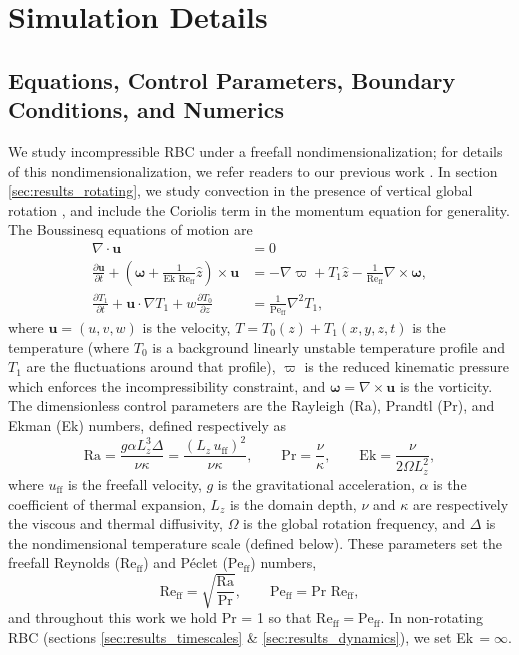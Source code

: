 \documentclass[aps, pre, onecolumn, nofootinbib, notitlepage, groupedaddress, amsfonts, amssymb, amsmath, longbibliography, superscriptaddress]{revtex4-1}
\newcommand{\DivU}{\ensuremath{\nabla\cdot\bm{u}}}
\newcommand{\grad}{\ensuremath{\nabla}}
\newcommand{\Reff}{\ensuremath{\text{Re}_{\text{ff}}}}
\newcommand{\Peff}{\ensuremath{\text{Pe}_{\text{ff}}}}
\begin{document}
\section{Simulation Details}
\label{sec:simulations}

\subsection{Equations, Control Parameters, Boundary Conditions, and Numerics}
We study incompressible RBC under a freefall nondimensionalization; for details of this nondimensionalization, we refer readers to our previous work \cite{anders&all2018}.
In section \ref{sec:results_rotating}, we study convection in the presence of vertical global rotation \cite{julien&all1996}, and include the Coriolis term in the momentum equation for generality.
The Boussinesq equations of motion are
\begin{align}
\DivU &= 0
	\label{eqn:incompressible}
\\
\frac{\partial \bm{u}}{\partial t} + \left(\bm{\omega} + \frac{1}{\text{Ek }\Reff}\hat{z}\right)\times\bm{u} 
&= - \grad \varpi + T_1\hat{z} - \frac{1}{\Reff}\grad\times\bm{\omega},
	\label{eqn:bouss_momentum}
\\
\frac{\partial T_1}{\partial t}  + \bm{u}\cdot\grad T_1 + w \frac{\partial T_0}{\partial z} 
&= \frac{1}{\Peff}\grad^2 T_1,
	\label{eqn:bouss_energy}
\end{align}
where $\bm{u} = (u, v, w)$ is the velocity, $T = T_0(z) + T_1(x, y, z, t)$ is the temperature (where $T_0$ is a background linearly unstable temperature profile and $T_1$ are the fluctuations around that profile), $\varpi$ is the reduced kinematic pressure \cite{anders&all2018} which enforces the incompressibility constraint, and $\bm{\omega} = \grad \times \bm{u}$ is the vorticity.
The dimensionless control parameters are the Rayleigh (Ra), Prandtl (Pr), and Ekman (Ek) numbers, defined respectively as
\begin{equation}
\text{Ra} = \frac{g \alpha L_z^3 \Delta}{\nu\kappa} = \frac{(L_z\,u_{\text{ff}})^2}{\nu\kappa}, \qquad \text{Pr} = \frac{\nu}{\kappa}, \qquad \text{Ek} = \frac{\nu}{2\Omega L_z^2},
\end{equation}
where $u_{\text{ff}}$ is the freefall velocity, $g$ is the gravitational acceleration, $\alpha$ is the coefficient of thermal expansion, $L_z$ is the domain depth, $\nu$ and $\kappa$ are respectively the viscous and thermal diffusivity, $\Omega$ is the global rotation frequency, and $\Delta$ is the nondimensional temperature scale (defined below).
These parameters set the freefall Reynolds (\Reff) and P\'{e}clet (\Peff) numbers, 
\begin{equation}
\Reff = \sqrt{\frac{\text{Ra}}{\text{Pr}}},\qquad
\Peff = \text{Pr }\Reff,
\end{equation}
and throughout this work we hold Pr = 1 so that $\Reff = \Peff$.
In non-rotating RBC (sections \ref{sec:results_timescales} \& \ref{sec:results_dynamics}), we set Ek$\,= \infty$.
\end{document}
